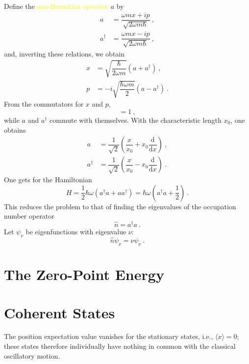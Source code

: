 \documentclass[11pt,a4paper]{article}
\newcommand{\dif}{\mathrm{d}}
\begin{document}
Define the \textcolor{yellow}{non-Hermitian operator} $a$ by
\begin{align}
a &= \dfrac{\omega m x +ip}{\sqrt{2\omega m \hbar}} ~, \\
a^\dagger &= \dfrac{\omega m x -ip}{\sqrt{2\omega m \hbar}} ~,
\end{align}
and, inverting these relations, we obtain
\begin{align}
x &= \sqrt{\dfrac{\hbar}{2\omega m}} (a +a^\dagger) ~, \\
p &= -i\sqrt{\dfrac{\hbar \omega m}{2}} (a -a^\dagger) ~.
\end{align}
From the commutators for $x$ and $p$,
\begin{equation}
[a, a^\dagger] = 1 ~,
\end{equation}
while $a$ and $a^\dagger$ commute with themselves. With the characteristic length $x_0$, one obtains
\begin{align}
a &= \dfrac{1}{\sqrt{2}} \left( \dfrac{x}{x_0} +x_0 \dfrac{\dif}{\dif x} \right) ~, \\
a^\dagger &= \dfrac{1}{\sqrt{2}} \left( \dfrac{x}{x_0} -x_0 \dfrac{\dif}{\dif x} \right) ~.
\end{align}
One gets for the Hamiltonian
\begin{equation}
H = \dfrac{1}{2} \hbar \omega (a^\dagger a +a a^\dagger) = \hbar \omega \left(a^\dagger a +\dfrac{1}{2} \right) ~.
\end{equation}
This reduces the problem to that of finding the eigenvalues of the occupation number operator
\begin{equation}
\hat{n} = a^\dagger a ~.
\end{equation}
Let $\psi_\nu$ be eigenfunctions with eigenvalue $\nu$:
\begin{equation}
\hat{n} \psi_\nu = \nu \psi_\nu ~.
\end{equation}


\section{The Zero-Point Energy}
\cite{schwabl2010quantum} 



\section{Coherent States}
\cite{schwabl2010quantum} The position expectation value vanishes for the stationary states, i.e., $\langle x \rangle = 0$; these states therefore individually have nothing in common with the classical oscillatory motion.
\end{document}
